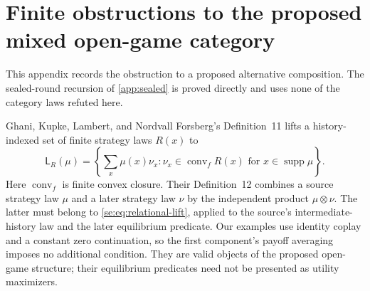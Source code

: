 \section{Finite obstructions to the proposed mixed open-game category}
\label{se:sec:open-game-obstruction}

This appendix records the obstruction to a proposed alternative
composition. The sealed-round recursion of \cref{app:sealed} is proved
directly and uses none of the category laws refuted here.

Ghani, Kupke, Lambert, and Nordvall Forsberg's Definition~11
\cite{GhaniEtAl2020} lifts a history-indexed set of finite strategy laws
$R(x)$ to
\begin{equation}\label{se:eq:relational-lift}
 \mathsf L_R(\mu)=
 \left\{\sum_x\mu(x)\nu_x:
       \nu_x\in\operatorname{conv}_{\!f}R(x)
       \text{ for }x\in\operatorname{supp}\mu\right\}.
\end{equation}
Here $\operatorname{conv}_{\!f}$ is finite convex closure. Their
Definition~12 combines a source strategy law $\mu$ and a later strategy
law $\nu$ by the independent product $\mu\otimes\nu$. The latter must
belong to \eqref{se:eq:relational-lift}, applied to the source's
intermediate-history law and the later equilibrium predicate.
Our examples use identity coplay and a constant zero continuation, so
the first component's payoff averaging imposes no additional condition.
They are valid objects of the proposed open-game structure; their
equilibrium predicates need not be presented as utility maximizers.

